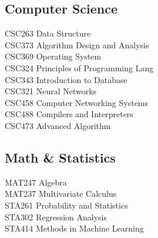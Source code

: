 \documentclass[]{deedy-resume-openfont}
\begin{document}
\begin{minipage}[t]{0.33\textwidth}
    \subsection{Computer Science}
    CSC263 Data Structure \\
    CSC373 Algorithm Design and Analysis  \\
    CSC369 Operating System \\
    CSC324 Principles of Programming Lang \\
    CSC343 Introduction to Database \\
    CSC321 Neural Networks \\
    CSC458 Computer Networking Systems \\
    CSC488 Compilers and Interpreters \\
    CSC473 Advanced Algorithm \\ 
    
    
    \sectionsep
    \subsection{Math \& Statistics}
    MAT247 Algebra  \\
    MAT237 Multivariate Calculus \\ 
    STA261 Probability and Statistics \\
    STA302 Regression Analysis \\ 
    STA414 Methods in Machine Learning \\
    
    
    
    \end{minipage} 
    \hfill
\end{document}
